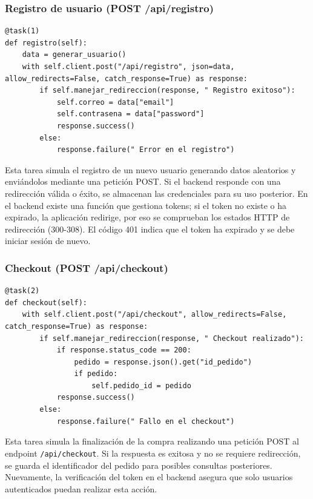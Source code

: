 \documentclass[10pt]{book}
\begin{document}
\subsubsection{Registro de usuario (POST /api/registro)}

\begin{lstlisting}[style=pythonclean, caption={Tarea para registrar un nuevo usuario}]
@task(1)
def registro(self):
    data = generar_usuario()
    with self.client.post("/api/registro", json=data, allow_redirects=False, catch_response=True) as response:
        if self.manejar_redireccion(response, " Registro exitoso"):
            self.correo = data["email"]
            self.contrasena = data["password"]
            response.success()
        else:
            response.failure(" Error en el registro")
\end{lstlisting}

Esta tarea simula el registro de un nuevo usuario generando datos aleatorios y enviándolos mediante una petición POST. Si el backend responde con una redirección válida o éxito, se almacenan las credenciales para su uso posterior. En el backend existe una función que gestiona tokens; si el token no existe o ha expirado, la aplicación redirige, por eso se comprueban los estados HTTP de redirección (300-308). El código 401 indica que el token ha expirado y se debe iniciar sesión de nuevo.

\subsubsection{Checkout (POST /api/checkout)}

\begin{lstlisting}[style=pythonclean, caption={Tarea para realizar el checkout}]
@task(2)
def checkout(self):
    with self.client.post("/api/checkout", allow_redirects=False, catch_response=True) as response:
        if self.manejar_redireccion(response, " Checkout realizado"):
            if response.status_code == 200:
                pedido = response.json().get("id_pedido")
                if pedido:
                    self.pedido_id = pedido
            response.success()
        else:
            response.failure(" Fallo en el checkout")
\end{lstlisting}

Esta tarea simula la finalización de la compra realizando una petición POST al endpoint \texttt{/api/checkout}. Si la respuesta es exitosa y no se requiere redirección, se guarda el identificador del pedido para posibles consultas posteriores. Nuevamente, la verificación del token en el backend asegura que solo usuarios autenticados puedan realizar esta acción.
\end{document}
